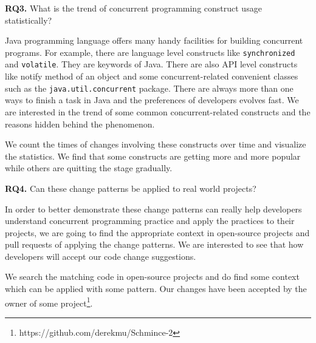 \textbf{RQ3.} What is the trend of concurrent programming construct usage statistically?

Java programming language offers many handy facilities for building concurrent programs. For example, there are language level constructs like \texttt{synchronized} and \texttt{volatile}. They are keywords of Java. There are also API level constructs like notify method of an object and some concurrent-related convenient classes such as the \texttt{java.util.concurrent} package. There are always more than one ways to finish a task in Java and the preferences of developers evolves fast. We are interested in the trend of some common concurrent-related constructs and the reasons hidden behind the phenomenon.

We count the times of changes involving these constructs over time and visualize the statistics. We find that some constructs are getting more and more popular while others are quitting the stage gradually.

\textbf{RQ4.} Can these change patterns be applied to real world projects?

In order to better demonstrate these change patterns can really help developers understand concurrent programming practice and apply the practices to their projects, we are going to find the appropriate context in open-source projects and pull requests of applying the change patterns. We are interested to see that how developers will accept our code change suggestions.

We search the matching code in open-source projects and do find some context which can be applied with some pattern. Our changes have been accepted by the owner of some project\footnote{https://github.com/derekmu/Schmince-2}.

